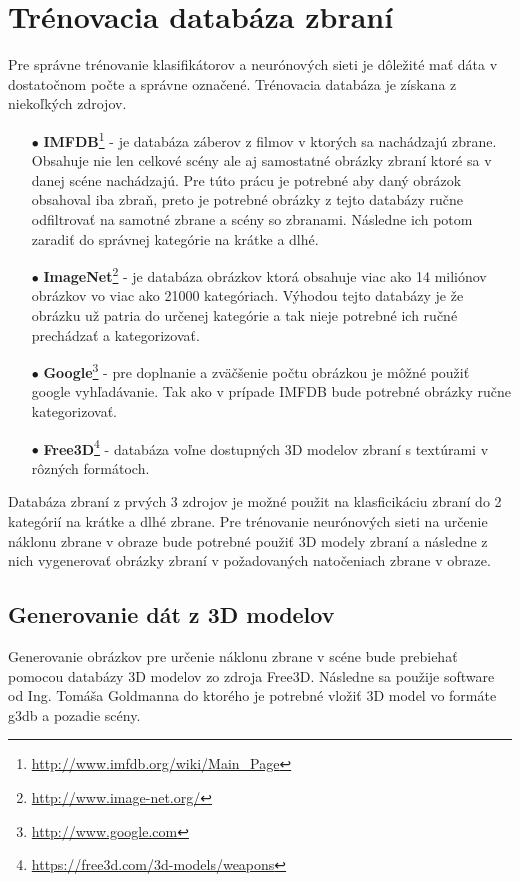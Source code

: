 
\section{Trénovacia databáza zbraní}
Pre správne trénovanie klasifikátorov a neurónových sieti je dôležité mať dáta v dostatočnom počte a správne označené.
Trénovacia databáza je získana z niekoľkých zdrojov.
\begin{enumerate}
    \item[$\bullet$] \textbf{IMFDB}\footnote{\url{http://www.imfdb.org/wiki/Main_Page}} - je databáza záberov z filmov v ktorých sa nachádzajú zbrane.
    Obsahuje nie len celkové scény ale aj samostatné obrázky zbraní ktoré sa v danej scéne nachádzajú.
    Pre túto prácu je potrebné aby daný obrázok obsahoval iba zbraň, preto je potrebné obrázky z tejto databázy ručne odfiltrovať na samotné zbrane a scény so zbranami.
    Následne ich potom zaradiť do správnej kategórie na krátke a dlhé.
    \item[$\bullet$] \textbf{ImageNet}\footnote{\url{http://www.image-net.org/}} - je databáza obrázkov ktorá obsahuje viac ako 14 miliónov obrázkov vo viac ako 21000 kategóriach.
    Výhodou tejto databázy je že obrázku už patria do určenej kategórie a tak nieje potrebné ich ručné prechádzať a kategorizovať.
    \item[$\bullet$] \textbf{Google}\footnote{\url{http://www.google.com}} - pre doplnanie a zväčšenie počtu obrázkou je môžné použiť google vyhľadávanie.
    Tak ako v prípade IMFDB bude potrebné obrázky ručne kategorizovať.
    \item[$\bullet$] \textbf{Free3D}\footnote{\url{https://free3d.com/3d-models/weapons}} - databáza voľne dostupných 3D modelov zbraní s textúrami v rôzných formátoch.
\end{enumerate}

Databáza zbraní z prvých 3 zdrojov je možné použit na klasficikáciu zbraní do 2 kategórií na krátke a dlhé zbrane.
Pre trénovanie neurónových sieti na určenie náklonu zbrane v obraze bude potrebné použiť 3D modely zbraní a následne z nich vygenerovať
    obrázky zbraní v požadovaných natočeniach zbrane v obraze.

\subsection{Generovanie dát z 3D modelov}
Generovanie obrázkov pre určenie náklonu zbrane v scéne bude prebiehať pomocou databázy 3D modelov zo zdroja Free3D.
Následne sa použije software od Ing. Tomáša Goldmanna do ktorého je potrebné vložiť 3D model vo formáte g3db a pozadie scény.

